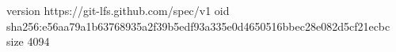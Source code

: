 version https://git-lfs.github.com/spec/v1
oid sha256:e56aa79a1b63768935a2f39b5edf93a335e0d4650516bbec28e082d5cf21ecbc
size 4094
